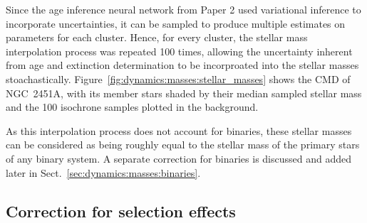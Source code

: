 Since the age inference neural network from Paper 2 used variational inference to incorporate uncertainties, it can be sampled to produce multiple estimates on parameters for each cluster. Hence, for every cluster, the stellar mass interpolation process was repeated 100 times, allowing the uncertainty inherent from age and extinction determination to be incorproated into the stellar masses stoachastically. Figure~\ref{fig:dynamics:masses:stellar_masses} shows the CMD of NGC~2451A, with its member stars shaded by their median sampled stellar mass and the 100 isochrone samples plotted in the background.

As this interpolation process does not account for binaries, these stellar masses can be considered as being roughly equal to the stellar mass of the primary stars of any binary system. A separate correction for binaries is discussed and added later in Sect.~\ref{sec:dynamics:masses:binaries}.


\subsection{Correction for selection effects}
\label{sec:dynamics:masses:selection}


